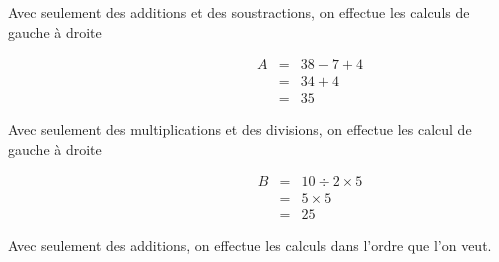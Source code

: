 \documentclass[a4paper,10pt]{report}
\begin{document}
\noindent \begin{minipage}{10cm} 
\begin{regle}
Avec seulement des additions et des soustractions, on effectue les calculs de gauche à droite
\end{regle}
\end{minipage}
\hspace{5mm}
\begin{minipage}{6cm}
\begin{ex}  

\vspace{-1cm}
\begin{eqnarray*}
\hspace{3cm}A &=& 38 -7 +4 \\
&=& 34 + 4 \\
&=& 35
\end{eqnarray*}
\end{ex}
\end{minipage}

\noindent \begin{minipage}{10cm} 
\begin{regle}
Avec seulement des multiplications et des divisions, on effectue les calcul de gauche à droite
\end{regle}
\end{minipage}
\hspace{5mm}
\begin{minipage}{6cm}
\begin{ex}

\vspace{-1cm}
\begin{eqnarray*}
\hspace{3cm}B &=& 10 \div 2 \times 5 \\
&=& 5 \times 5 \\
&=& 25
\end{eqnarray*}
\end{ex}
\end{minipage}

\begin{regle}
Avec seulement des additions, on effectue les calculs dans l'ordre que l'on veut.
\end{regle}
\end{document}
